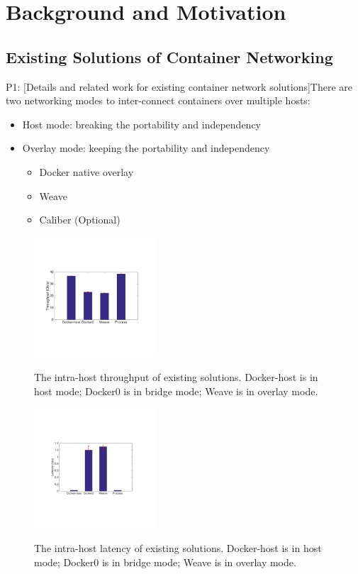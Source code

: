 \section{Background and Motivation}
\label{sec:motivation}

\subsection{Existing Solutions of Container Networking}

P1: [Details and related work for existing container network solutions]There are two networking modes to inter-connect containers over multiple hosts:

\begin{itemize}
  \item Host mode: breaking the portability and independency
  \item Overlay mode: keeping the portability and independency
  \begin{itemize}
  \item Docker native overlay
  \item Weave
  \item Caliber (Optional)
  \end{itemize}  
\end{itemize}

\begin{figure}[ht]
     \centering 
     \includegraphics[width=0.4\textwidth]{figures/motivation/eval_exist_bw.pdf} 
     \label{fig:eval_exist_bw}
     \caption{The intra-host throughput of existing solutions. Docker-host is in host mode; Docker0 is in bridge mode; Weave is in overlay mode.} 
\end{figure} 

\begin{figure}[ht]
     \centering 
     \includegraphics[width=0.4\textwidth]{figures/motivation/eval_exist_latency.pdf} 
     \label{fig:eval_exist_latency}
     \caption{The intra-host latency of existing solutions. Docker-host is in host mode; Docker0 is in bridge mode; Weave is in overlay mode.} 
\end{figure} 

